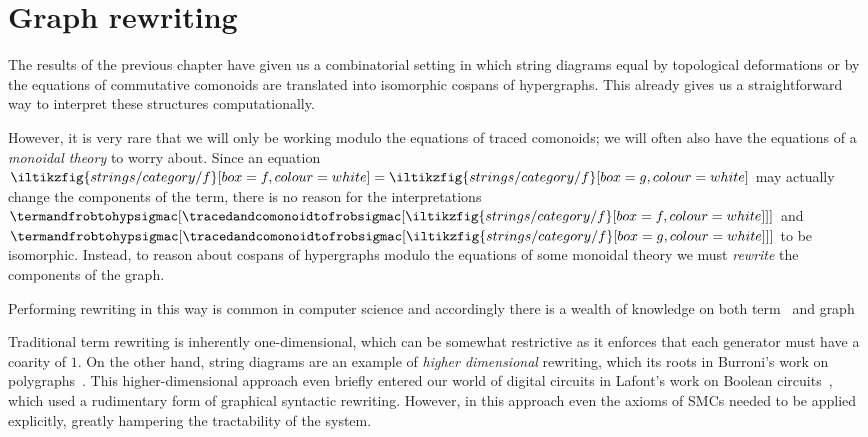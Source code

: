 \chapter{Graph rewriting}

The results of the previous chapter have given us a combinatorial setting in
which string diagrams equal by topological deformations or by the equations of
commutative comonoids are translated into isomorphic cospans of hypergraphs.
This already gives us a straightforward way to interpret these structures
computationally.

However, it is very rare that we will only be working modulo the equations of
traced comonoids; we will often also have the equations of a
\emph{monoidal theory} to worry about.
Since an equation \(
    \iltikzfig{strings/category/f}[box=f,colour=white]
    =
    \iltikzfig{strings/category/f}[box=g,colour=white]
\) may actually change the components of the term, there is no reason for the
interpretations \(
    \termandfrobtohypsigmac[
        \tracedandcomonoidtofrobsigmac[
            \iltikzfig{strings/category/f}[box=f,colour=white]
        ]
    ]
\) and \(
    \termandfrobtohypsigmac[
        \tracedandcomonoidtofrobsigmac[
            \iltikzfig{strings/category/f}[box=g,colour=white]
        ]
    ]
\) to be isomorphic.
Instead, to reason about cospans of hypergraphs modulo the equations of some
monoidal theory we must \emph{rewrite} the components of the graph.

Performing rewriting in this way is common in computer science and accordingly
there is a wealth of knowledge on both
term~\cite{knuth1970simple,gadduchi1996algebraic} and graph~\cite{}

Traditional term rewriting is inherently one-dimensional, which can be somewhat
restrictive as it enforces that each generator must have a coarity of \(1\).
On the other hand, string diagrams are an example of \emph{higher dimensional}
rewriting, which its roots in Burroni's work on
polygraphs~\cite{burroni1993higherdimensional}.
This higher-dimensional approach even briefly entered our world of digital
circuits in Lafont's work on Boolean circuits~\cite{lafont2003algebraic}, which
used a rudimentary form of graphical syntactic rewriting.
However, in this approach even the axioms of SMCs needed to be applied
explicitly, greatly hampering the tractability of the system.

